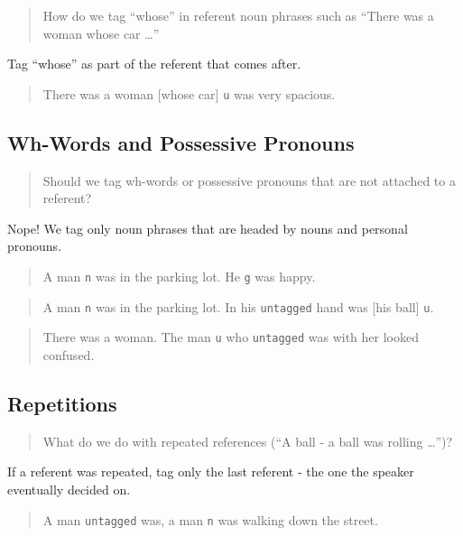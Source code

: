 \documentclass[
]{book}
\begin{document}
\begin{quote}
How do we tag ``whose'' in referent noun phrases such as ``There was a woman whose car \ldots{}''
\end{quote}

Tag ``whose'' as part of the referent that comes after.

\begin{quote}
There was a woman {[}whose car{]} \texttt{u} was very spacious.
\end{quote}

\hypertarget{wh-words-and-possessive-pronouns}{%
\subsection{Wh-Words and Possessive Pronouns}\label{wh-words-and-possessive-pronouns}}

\begin{quote}
Should we tag wh-words or possessive pronouns that are not attached to a referent?
\end{quote}

Nope!
We tag only noun phrases that are headed by nouns and personal pronouns.

\begin{quote}
A man \texttt{n} was in the parking lot.
He \texttt{g} was happy.
\end{quote}

\begin{quote}
A man \texttt{n} was in the parking lot.
In his \texttt{untagged} hand was {[}his ball{]} \texttt{u}.
\end{quote}

\begin{quote}
There was a woman.
The man \texttt{u} who \texttt{untagged} was with her looked confused.
\end{quote}

\hypertarget{repetitions}{%
\subsection{Repetitions}\label{repetitions}}

\begin{quote}
What do we do with repeated references (``A ball - a ball was rolling \ldots{}'')?
\end{quote}

If a referent was repeated, tag only the last referent - the one the speaker eventually decided on.

\begin{quote}
A man \texttt{untagged} was, a man \texttt{n} was walking down the street.
\end{quote}
\end{document}
